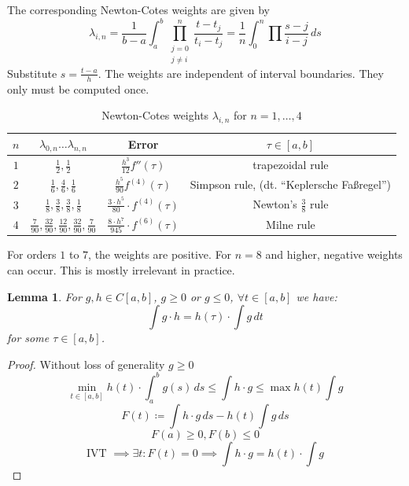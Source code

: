 \documentclass[a4paper]{article}
\newcounter{lecref}[section]
\numberwithin{lecref}{section}
\theoremstyle{break}
\newtheorem{lemma}[lecref]{Lemma}
\newcommand{\dt}[1]{(dt. \enquote{\foreignlanguage{german}{#1}})}
\begin{document}
The corresponding Newton-Cotes weights are given by
\[ \lambda_{i,n} = \frac{1}{b - a} \int_a^b \prod_{\substack{j = 0 \\ j \neq i}}^n \frac{t - t_j}{t_i - t_j} = \frac 1n \int_0^n \prod \frac{s - j}{i - j} \, ds \]
Substitute $s = \frac{t - a}{h}$.  The weights are independent of interval boundaries. They only must be computed once.

\begin{table}[!ht]
  \begin{center}
    \begin{tabular}{cccc}
      $n$ & $\lambda_{0,n} \dots \lambda_{n,n}$   & Error & $\tau \in [a,b]$ \\
    \hline
      $1$ & $\frac12, \frac12$                    & $\frac{h^3}{12} f''(\tau)$                     & trapezoidal rule \\
      $2$ & $\frac16, \frac46, \frac16$           & $\frac{h^5}{90} f^{(4)}(\tau)$                 & Simpson rule, \dt{Keplersche Faßregel} \\
      $3$ & $\frac18, \frac38, \frac38, \frac18$  & $\frac{3 \cdot h^5}{80} \cdot f^{(4)}(\tau)$   & Newton's $\frac38$ rule \\
      $4$ & $\frac7{90}, \frac{32}{90}, \frac{12}{90}, \frac{32}{90}, \frac{7}{90}$ & $\frac{8 \cdot h^7}{945} \cdot f^{(6)}(\tau)$ & Milne rule
    \end{tabular}
    \caption{Newton-Cotes weights $\lambda_{i,n}$ for $n = 1, \dots, 4$}
  \end{center}
\end{table}

For orders $1$ to $7$, the weights are positive. For $n = 8$ and higher, negative weights can occur. This is mostly irrelevant in practice.

\begin{lemma}
  \label{lemma:5-5}
  For $g, h \in C[a, b]$, $g \geq 0$ or $g \leq 0$, $\forall t \in [a, b]$ we have:
  \[ \int g \cdot h = h(\tau) \cdot \int g \, dt \]
  for some $\tau \in [a, b]$.
\end{lemma}

\begin{proof}
  Without loss of generality $g \geq 0$
  \[ \min_{t \in [a,b]} h(t) \cdot \int_a^b g(s) \, ds \leq \int h \cdot g \leq \max h(t) \int g \]
  \[ F(t) \coloneqq \int h \cdot g \, ds - h(t) \int g \, ds \]
  \[ F(a) \geq 0, F(b) \leq 0 \]
  \[ \text{IVT } \implies \exists t: F(t) = 0 \implies \int h \cdot g = h(t) \cdot \int g \]
\end{proof}
\end{document}
